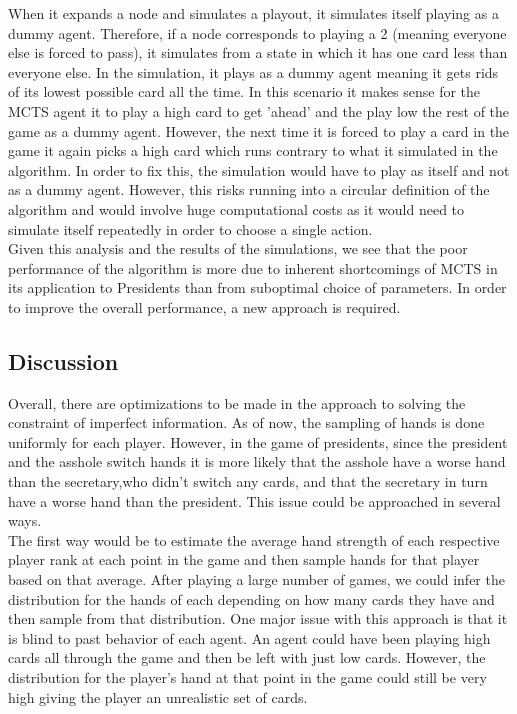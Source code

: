 \documentclass[11pt]{article}
\begin{document}
When it expands a node and simulates a playout, it simulates itself playing as a dummy agent. Therefore, if a node corresponds to playing a 2 (meaning everyone else is forced to pass), it simulates from a state in which it has one card less than everyone else. In the simulation, it plays as a dummy agent meaning it gets rids of its lowest possible card all the time. In this scenario it makes sense for the MCTS agent it to play a high card to get 'ahead' and the play low the rest of the game as a dummy agent. However, the next time it is forced to play a card in the game it again picks a high card which runs contrary to what it simulated in the algorithm. In order to fix this, the simulation would have to play as itself and not as a dummy agent. However, this risks running into a circular definition of the algorithm and would involve huge computational costs as it would need to simulate itself repeatedly in order to choose a single action.\\

Given this analysis and the results of the simulations, we see that the poor performance of the algorithm is more due to inherent shortcomings of MCTS in its application to Presidents than from suboptimal choice of parameters. In order to improve the overall performance, a new approach is required.


 
\subsection{Discussion}
Overall, there are optimizations to be made in the approach to solving the constraint of imperfect information. As of now, the sampling of hands is done uniformly for each player. However, in the game of presidents, since the president and the asshole switch hands it is more likely that the asshole have a worse hand than the secretary,who didn't switch any cards, and that the secretary in turn have a worse hand than the president. This issue could be approached in several ways.\\

The first way would be to estimate the average hand strength of each respective player rank at each point in the game and then sample hands for that player based on that average. After playing a large number of games, we could infer the distribution for the hands of each depending on how many cards they have and then sample from that distribution. One major issue with this approach is that it is blind to past behavior of each agent. An agent could have been playing high cards all through the game and then be left with just low cards. However, the distribution for the player's hand at that point in the game could still be very high giving the player an unrealistic set of cards.\\
\end{document}
